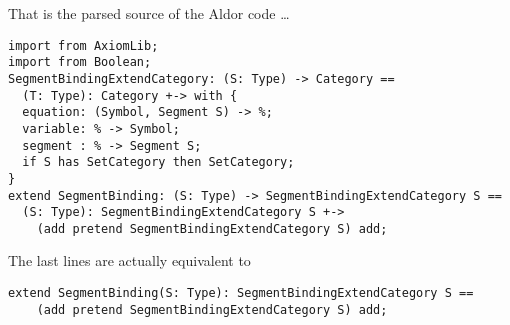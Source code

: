 \documentclass{article}
\begin{document}
That is the parsed source of the Aldor code \ldots
\begin{verbatim}
import from AxiomLib;
import from Boolean;
SegmentBindingExtendCategory: (S: Type) -> Category == 
  (T: Type): Category +-> with {
  equation: (Symbol, Segment S) -> %;
  variable: % -> Symbol;
  segment : % -> Segment S;
  if S has SetCategory then SetCategory;
}
extend SegmentBinding: (S: Type) -> SegmentBindingExtendCategory S ==
  (S: Type): SegmentBindingExtendCategory S +-> 
    (add pretend SegmentBindingExtendCategory S) add;
\end{verbatim}
The last lines are actually equivalent to
\begin{verbatim}
extend SegmentBinding(S: Type): SegmentBindingExtendCategory S ==
    (add pretend SegmentBindingExtendCategory S) add;
\end{verbatim}
\end{document}
